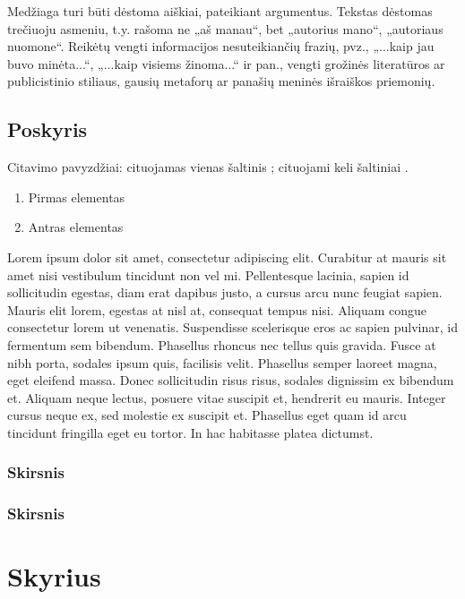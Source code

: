 \documentclass{VUMIFPSkursinis}
\begin{document}
Medžiaga turi būti dėstoma aiškiai, pateikiant argumentus. Tekstas dėstomas
trečiuoju asmeniu, t.y. rašoma ne „aš manau“, bet „autorius mano“, „autoriaus
nuomone“. Reikėtų vengti informacijos nesuteikiančių frazių, pvz., „...kaip jau
buvo minėta...“, „...kaip visiems žinoma...“ ir pan., vengti grožinės literatūros
ar publicistinio stiliaus, gausių metaforų ar panašių meninės išraiškos
priemonių.

\subsection{Poskyris}
Citavimo pavyzdžiai: cituojamas vienas šaltinis \cite{PvzStraipsnLt}; cituojami
keli šaltiniai \cite{PvzStraipsnEn, PvzKonfLt, PvzKonfEn, PvzKnygLt, PvzKnygEn,
PvzElPubLt, PvzElPubEn, PvzMagistrLt, PvzPhdEn}.

\begin{enumerate}
	\item Pirmas elementas
	\item Antras elementas
\end{enumerate}

Lorem ipsum dolor sit amet, consectetur adipiscing elit. Curabitur at mauris sit amet nisi vestibulum tincidunt non vel mi. Pellentesque lacinia, sapien id sollicitudin egestas, diam erat dapibus justo, a cursus arcu nunc feugiat sapien. Mauris elit lorem, egestas at nisl at, consequat tempus nisi. Aliquam congue consectetur lorem ut venenatis. Suspendisse scelerisque eros ac sapien pulvinar, id fermentum sem bibendum. Phasellus rhoncus nec tellus quis gravida. Fusce at nibh porta, sodales ipsum quis, facilisis velit. Phasellus semper laoreet magna, eget eleifend massa. Donec sollicitudin risus risus, sodales dignissim ex bibendum et. Aliquam neque lectus, posuere vitae suscipit et, hendrerit eu mauris. Integer cursus neque ex, sed molestie ex suscipit et. Phasellus eget quam id arcu tincidunt fringilla eget eu tortor. In hac habitasse platea dictumst.



\subsubsection{Skirsnis}
\subsubsection{Skirsnis}
\section{Skyrius}
\end{document}
